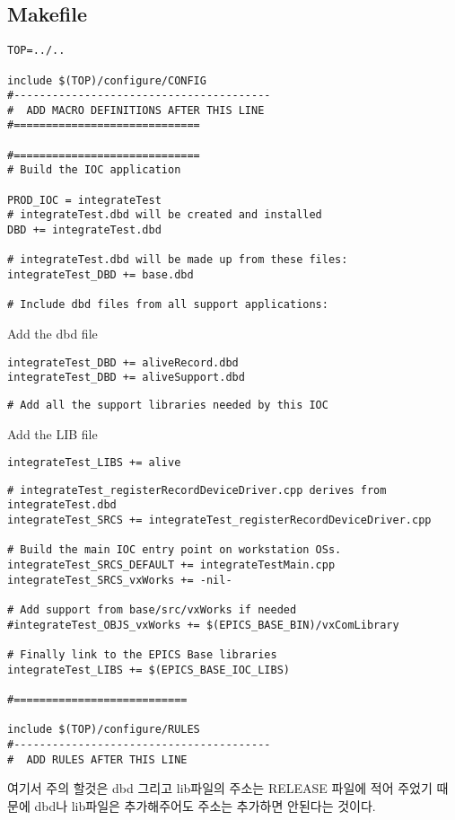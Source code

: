 \documentclass[11pt
  , a4paper
  , article
  , oneside
]{memoir}
\begin{document}
\subsection{Makefile}
\begin{lstlisting}[style=termstyle]
TOP=../..

include $(TOP)/configure/CONFIG
#----------------------------------------
#  ADD MACRO DEFINITIONS AFTER THIS LINE
#=============================

#=============================
# Build the IOC application

PROD_IOC = integrateTest
# integrateTest.dbd will be created and installed
DBD += integrateTest.dbd

# integrateTest.dbd will be made up from these files:
integrateTest_DBD += base.dbd

# Include dbd files from all support applications:
\end{lstlisting}
Add the dbd file
\begin{lstlisting}[style=termstyle]
integrateTest_DBD += aliveRecord.dbd
integrateTest_DBD += aliveSupport.dbd
\end{lstlisting}
\begin{lstlisting}[style=termstyle]
# Add all the support libraries needed by this IOC
\end{lstlisting}
Add the LIB file
\begin{lstlisting}[style=termstyle]
integrateTest_LIBS += alive
\end{lstlisting}
\begin{lstlisting}[style=termstyle]
# integrateTest_registerRecordDeviceDriver.cpp derives from integrateTest.dbd
integrateTest_SRCS += integrateTest_registerRecordDeviceDriver.cpp

# Build the main IOC entry point on workstation OSs.
integrateTest_SRCS_DEFAULT += integrateTestMain.cpp
integrateTest_SRCS_vxWorks += -nil-

# Add support from base/src/vxWorks if needed
#integrateTest_OBJS_vxWorks += $(EPICS_BASE_BIN)/vxComLibrary

# Finally link to the EPICS Base libraries
integrateTest_LIBS += $(EPICS_BASE_IOC_LIBS)

#===========================

include $(TOP)/configure/RULES
#----------------------------------------
#  ADD RULES AFTER THIS LINE
\end{lstlisting}
여기서 주의 할것은 dbd 그리고 lib파일의 주소는 RELEASE 파일에 적어 주었기 때문에 dbd나 lib파일은 추가해주어도 주소는 추가하면 안된다는 것이다.
\end{document}
